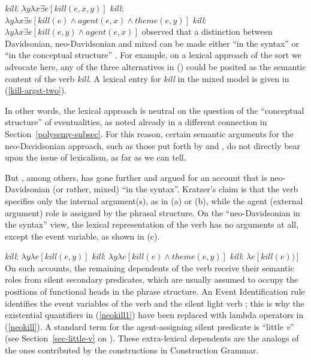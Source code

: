 \eal\settowidth{} \label{neokill1}
\ex \emph{kill}: $\lambda y\lambda x\exists e[kill(e, x, y)]$  
\ex \emph{kill}: $\lambda y\lambda x\exists e[kill(e) \wedge agent(e, x) \wedge theme(e, y)]$ 
\ex \emph{kill}: $\lambda y\lambda x\exists e[kill(e,y) \wedge agent(e, x)]$ 
\zl
\citet{Kratzer96a} observed that a distinction between Davidsonian, neo-Davidsonian and mixed can be
made either ``in the syntax'' or ``in the conceptual structure'' \citep[--111]{Kratzer96a}.  For
example, on a lexical approach of the sort we advocate here, any of the three alternatives in
() could be posited as the semantic content of the verb \emph{kill}.  A lexical entry for
\emph{kill} in the mixed model is given in (\ref{kill-argst-two}). 

\ea\label{kill-argst-two}
\z
In other words, the lexical approach is neutral on the question of the ``conceptual structure'' of eventualities, as noted already in a different connection in 
Section~\ref{polysemy-subsec}.  For this reason, certain semantic arguments for the neo-Davidsonian approach, such as those put forth by  \citet[Chapter~4]{Schein93a-u} 
and \citet{Lohndal2012a}, do not directly bear upon the issue of lexicalism, as far as we can tell.  

But \citet{Kratzer96a}, among others, has gone further and argued for an account that is neo-Davidsonian (or rather, mixed) ``in the syntax''.  
Kratzer's claim is that the verb specifies only the internal argument(s), as in (a) or (b), while the agent (external argument) role is assigned by the phrasal structure.  
On the ``neo-Davidsonian in the syntax'' view, the lexical representation of the verb has no arguments at all, except the event variable, as shown in (c).

\eal
\label{neokill}\settowidth{}
\ex \emph{kill}: $\lambda y\lambda e[kill(e, y)]$                         
\ex \emph{kill}: $\lambda y\lambda e[kill(e) \wedge theme(e, y)]$ 
\ex \emph{kill}: $\lambda e[kill(e))]$                                  
\zl
On such accounts, the remaining dependents of the verb receive their semantic roles from silent secondary predicates,
which are usually assumed to occupy the positions of functional heads in the phrase structure.  An
Event Identification rule identifies the event variables of the verb and the silent light verb
\citep[]{Kratzer96a}; this is why the existential quantifiers in (\ref{neokill1}) have been
replaced with lambda operators in  (\ref{neokill}).  A standard term for the agent-assigning silent
predicate is ``little \emph{v}'' (see
Section~\ref{sec-little-v} on \littlev).  These extra-lexical dependents are the analogs of the ones
contributed by the constructions in Construction Grammar.   

